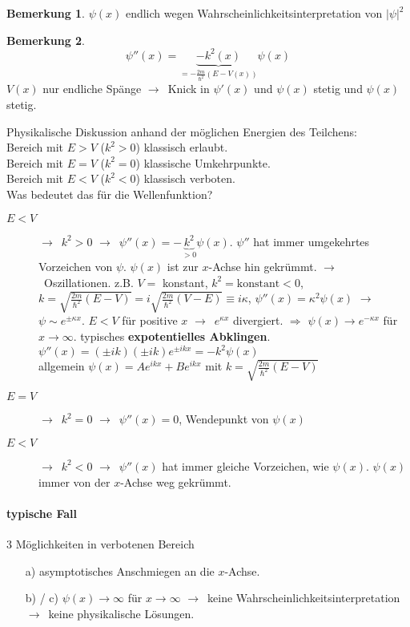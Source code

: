 \documentclass[oneside]{book}
\theoremstyle{definition}
\newtheorem*{bemerkung*}{Bemerkung}
\newcommand{\conseq}{$\rightarrow$~}
\newcommand{\const}{\text{konstant}}
\begin{document}
\begin{bemerkung*}
	$\psi(x)$ endlich wegen Wahrscheinlichkeitsinterpretation von $|\psi|^2$
\end{bemerkung*}

\begin{bemerkung*}
	$$\psi''(x) = \underbrace{- k^2(x)}_{= - \frac{2m}{\hbar^2} (E - V(x))} \psi(x)$$
	$V(x)$ nur endliche Spänge \conseq Knick in $\psi'(x)$ und $\psi(x)$ stetig und $\psi(x)$ stetig.
\end{bemerkung*}

Physikalische Diskussion anhand der möglichen Energien des Teilchens:\\
Bereich mit $E > V$ ($k^2 > 0$) klassisch erlaubt.\\
Bereich mit $E = V$ ($k^2 = 0$) klassische Umkehrpunkte.\\
Bereich mit $E < V$ ($k^2 < 0$) klassisch verboten.\\
Was bedeutet das für die Wellenfunktion?
\begin{description}
	\item[$E < V$] \conseq $k^2 > 0 $ \conseq $\psi''(x) = - \underbrace{k^2}_{> 0} \psi(x)$. $\psi''$ hat immer umgekehrtes Vorzeichen von $\psi$. $\psi(x)$ ist zur $x$-Achse hin gekrümmt. \conseq Oszillationen. z.B. $V = $ konstant, $k^2 = \const < 0$, $k=\sqrt{\frac{2m}{\hbar^2} (E - V)} = i \sqrt{\frac{2m}{\hbar^2} (V - E)} \equiv i \kappa $, $\psi''(x) = \kappa^2 \psi(x)$ \conseq $\psi \sim e^{\pm \kappa x}$. $E < V$ für positive $x$ \conseq $e^{\kappa x}$ divergiert. $\Rightarrow$ $\psi(x) \to e^{-\kappa x}$ für $x \to \infty$. typisches \textbf{expotentielles Abklingen}. %
	$\psi''(x) = (\pm i k) (\pm i k) e^{\pm i k x} = - k^2 \psi(x)$\\
	allgemein $\psi(x) = A e^{ikx} + Be^{ikx}$ mit $k = \sqrt{\frac{2m}{\hbar^2} (E -V)}$
	\item[$E = V$] \conseq $k^2 = 0$ \conseq $\psi''(x) = 0$, Wendepunkt von $\psi(x)$
	\item[$E < V$] \conseq $k^2 < 0$ \conseq $\psi''(x)$ hat immer gleiche Vorzeichen, wie $\psi(x)$. $\psi(x)$ immer von der $x$-Achse weg gekrümmt.
\end{description}

\paragraph{typische Fall}
3 Möglichkeiten in verbotenen Bereich
\begin{itemize}
	\item[a)] asymptotisches Anschmiegen an die $x$-Achse.
	\item[b) / c)] $\psi(x) \to \infty$ für $x \to \infty$ \conseq keine Wahrscheinlichkeitsinterpretation \conseq keine physikalische Lösungen.
\end{itemize}
\end{document}
